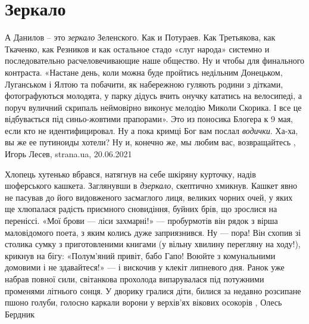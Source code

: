  
 
 
 
 
\chapter{Зеркало}
\label{sec:slova.zerkalo}

А Данилов – это \emph{зеркало} Зеленского. Как и Потураев. Как Третьякова, как
Ткаченко, как Резников и как остальное стадо «слуг народа» системно и
последовательно расчеловечивающие наше общество.  Ну и чтобы для финального
контраста. «Настане день, коли можна буде пройтись недільним Донецьком,
Луганськом і Ялтою та побачити, як набережною гуляють родини з дітками,
фотографуються молодята, у парку дідусь вчить онучку кататись на велосипеді, а
поруч вуличний скрипаль неймовірно виконує мелодію Миколи Скорика. І все це
відбувається під синьо-жовтими прапорами». Это из поносика Блогера к 9 мая,
если кто не идентифицировал. Ну а пока кримці Бог вам послал \emph{водички}. Ха-ха, вы
же ее путиноиды хотели? Ну и, конечно же, мы любим вас, возвращайтесь
, 
Игорь Лесев, strana.ua, 20.06.2021

Хлопець хутенько вбрався, натягнув на себе шкіряну курточку, надів шоферського
кашкета. Заглянувши в \emph{дзеркало}, скептично хмикнув. Кашкет явно не пасував до
його видовженого засмаглого лиця, великих чорних очей, у яких ще хлюпалася
радість приємного сновидіння, буйних брів, що зрослися на переніссі. «Мої брови
— ліси захмарні!» — пробурмотів він рядок з вірша маловідомого поета, з яким
колись дуже заприязнився. Ну — пора! Він схопив зі столика сумку з
приготовленими книгами (у вільну хвилину перегляну на ходу!), крикнув на бігу:
«Полум’яний привіт, бабо Гапо! Воюйте з комунальними домовими і не здавайтеся!»
— і вискочив у клекіт липневого дня. Ранок уже набрав повної сили, світанкова
прохолода випарувалася під потужними променями літнього сонця. У дворику
гралися діти, билися за недавно розсипане пшоно голуби, голосно каркали ворони
у верхів’ях вікових осокорів
, Олесь Бердник
